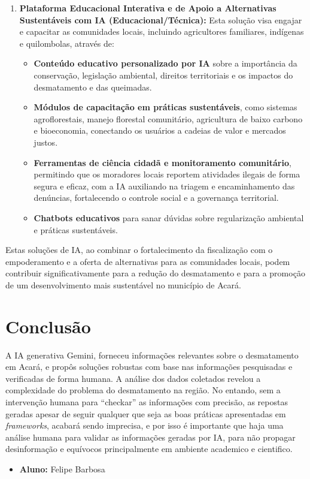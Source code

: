 \documentclass[12pt, a4paper, onecolumn, notitlepage]{article}
\begin{document}
\begin{enumerate}
        \item \textbf{Plataforma Educacional Interativa e de Apoio a Alternativas Sustentáveis com IA (Educacional/Técnica):} Esta solução visa engajar e capacitar as comunidades locais, incluindo agricultores familiares, indígenas e quilombolas, através de:
        \begin{itemize}
            \item \textbf{Conteúdo educativo personalizado por IA} sobre a importância da conservação, legislação ambiental, direitos territoriais e os impactos do desmatamento e das queimadas.
            \item \textbf{Módulos de capacitação em práticas sustentáveis}, como sistemas agroflorestais, manejo florestal comunitário, agricultura de baixo carbono e bioeconomia, conectando os usuários a cadeias de valor e mercados justos.
            \item \textbf{Ferramentas de ciência cidadã e monitoramento comunitário}, permitindo que os moradores locais reportem atividades ilegais de forma segura e eficaz, com a IA auxiliando na triagem e encaminhamento das denúncias, fortalecendo o controle social e a governança territorial.
            \item \textbf{Chatbots educativos} para sanar dúvidas sobre regularização ambiental e práticas sustentáveis.
        \end{itemize}
    \end{enumerate}

    Estas soluções de IA, ao combinar o fortalecimento da fiscalização com o empoderamento e a oferta de alternativas para as comunidades locais, podem contribuir significativamente para a redução do desmatamento e para a promoção de um desenvolvimento mais sustentável no município de Acará.
    

    \section{Conclusão}
    A IA generativa Gemini, forneceu informações relevantes sobre o desmatamento em Acará, e propôs soluções robustas com base nas informações pesquisadas e verificadas de forma humana. A análise dos dados coletados revelou a complexidade do problema do desmatamento na região. No entando, sem a intervenção humana para ``checkar'' as informações com precisão, as repostas geradas apesar de seguir qualquer que seja as boas práticas apresentadas em \emph{frameworks}, acabará sendo imprecisa, e por isso é importante que haja uma análise humana para validar as informações geradas por IA, para não propagar desinformação e equívocos principalmente em ambiente academico e cientifico.

    \begin{itemize}
        \item \textbf{Aluno:} Felipe Barbosa
    \end{itemize}
    
\end{document}
